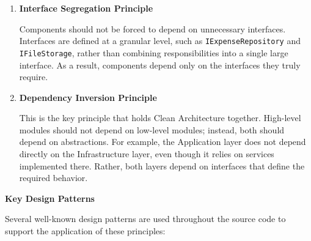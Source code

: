 \begin{enumerate} [leftmargin=0.75cm]
    \item \textbf{Interface Segregation Principle}

    Components should not be forced to depend on unnecessary interfaces. Interfaces are defined at a granular level, such as \texttt{IExpenseRepository} and \texttt{IFileStorage}, rather than combining responsibilities into a single large interface. As a result, components depend only on the interfaces they truly require.

    \item \textbf{Dependency Inversion Principle}

    This is the key principle that holds Clean Architecture together. High-level modules should not depend on low-level modules; instead, both should depend on abstractions. For example, the Application layer does not depend directly on the Infrastructure layer, even though it relies on services implemented there. Rather, both layers depend on interfaces that define the required behavior.  

\end{enumerate}

\textbf{Key Design Patterns}

Several well-known design patterns are used throughout the source code to support the application of these principles:


